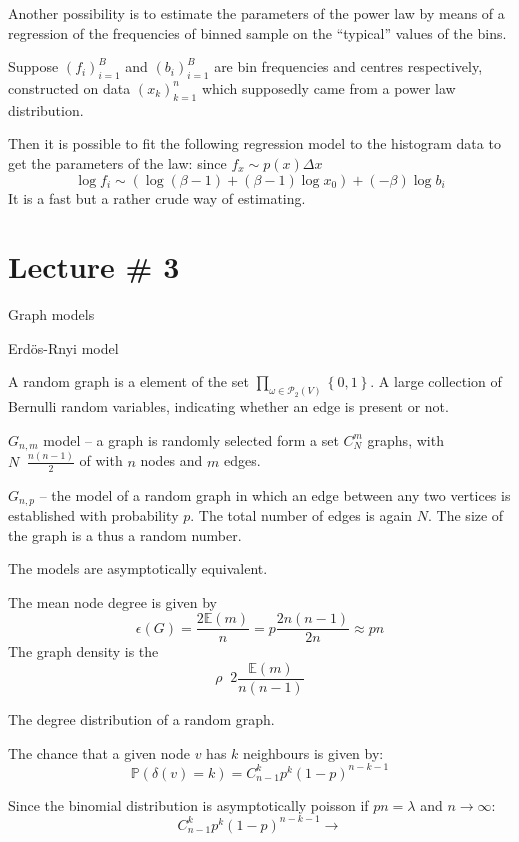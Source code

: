\documentclass[a4paper]{article}
\newcommand{\obj}[1]{{\left\{ #1 \right \}}}
\newcommand{\brac}[1]{{\left ( #1 \right )}}
\newcommand{\Pwr}{\mathcal{P}}
\newcommand{\pr}{\mathbb{P}}
\newcommand{\Ex}{\mathbb{E}}
\newcommand{\defn}{\mathop{\overset{\Delta}{=}}\nolimits}
\begin{document}
Another possibility is to estimate the parameters of the power law by means of a regression of the frequencies of binned sample on the ``typical'' values of the bins.

Suppose $\brac{f_i}_{i=1}^B$ and $\brac{b_i}_{i=1}^B$ are bin frequencies and centres respectively, constructed on data $\brac{x_k}_{k=1}^n$ which supposedly came from a power law distribution.

Then it is possible to fit the following regression model to the histogram data to get the parameters of the law:
since $f_x \sim p(x) \Delta x$
\[\log f_i \sim \brac{\log{(\beta-1)} + (\beta-1) \log x_0} + (-\beta) \log b_i\]
It is a fast but a rather crude way of estimating.



\section{Lecture \# 3} %
\label{sec:lecture_3}

Graph models

Erd\"os-Rnyi model

A random graph is a element of the set $\prod_{\omega\in \Pwr_2(V)} \obj{0,1}$.
A large collection of Bernulli random variables, indicating whether an edge is present or not.

$G_{n,m}$ model -- a graph is randomly selected form a set  $C_N^m$ graphs, with $N\defn \frac{n(n-1)}{2}$ of with $n$ nodes and $m$ edges.

$G_{n,p}$ -- the model of a random graph in which an edge between
any two vertices is established with probability $p$. The total
number of edges is again $N$. The size of the graph is a thus a
random number.

The models are asymptotically equivalent.

The mean node degree is given by
\[\epsilon(G) = \frac{2 \Ex(m)}{n} = p\frac{2 n(n-1)}{2 n} \approx p n\]
The graph density is the \[\rho \defn 2\frac{\Ex(m)}{n(n-1)}\]

The degree distribution of a random graph.

The chance that a given node $v$ has $k$ neighbours is given by:
\[\pr\brac{\delta(v) = k} = C^k_{n-1} p^k \brac{1-p}^{n-k-1}\]

Since the binomial distribution is asymptotically poisson if $p n = \lambda$ and $n\to \infty$:
\[C^k_{n-1} p^k \brac{1-p}^{n-k-1} \to \]
\end{document}
